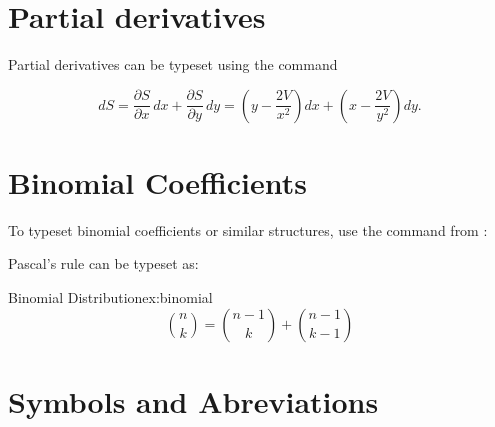 \section{Partial derivatives}

Partial derivatives can be typeset using the \latex{} command \CMDI{\partial}

\begin{texexample}{}{}

\[
dS = \frac{\partial S}{\partial x}\, dx
   + \frac{\partial S}{\partial y}\, dy
   = \left(y - \frac{2V}{x^2}\right) dx
   + \left(x - \frac{2V}{y^2}\right) dy.
\]
\end{texexample}




\section{Binomial Coefficients}

To typeset binomial coefficients or similar structures, use the command
 from :

Pascal's rule can be typeset as:


\begin{texexample}{Binomial Distribution}{ex:binomial}
\[
\binom{n}{k} =\binom{n-1}{k}
+ \binom{n-1}{k-1}
\]
\end{texexample}



\section[Symbols and Abbreviations]{Symbols and Abreviations}

\label{abbr}\label{symbols}%

\newlength{\dentwidth}\setlength{\dentwidth}{\textwidth}
\addtolength{\dentwidth}{-\parindent}


 \def\Par{%
   \mathchoice
      {\@parallelogram\scriptsize}%
      {\@parallelogram\scriptsize}%
      {\@parallelogram\tiny}%
      {\@parallelogram\tiny}}
\def\@parallelogram#1{%
  \textnormal{\setbox\z@\hbox{#1/}\dimen@\wd\z@
   \@tempdima 2.45\dimen@
   \vbox{\offinterlineskip
      \hbox{\kern.8\dimen@\vrule\@width\@tempdima\@height.4\p@}%
      \kern-.0\p@
      \hbox to\@tempdima{#1/\hfil\rlap/}%
      \kern-.5\p@
      \hbox{\kern.1\dimen@\vrule\@width\@tempdima\@height.4\p@}}}}

